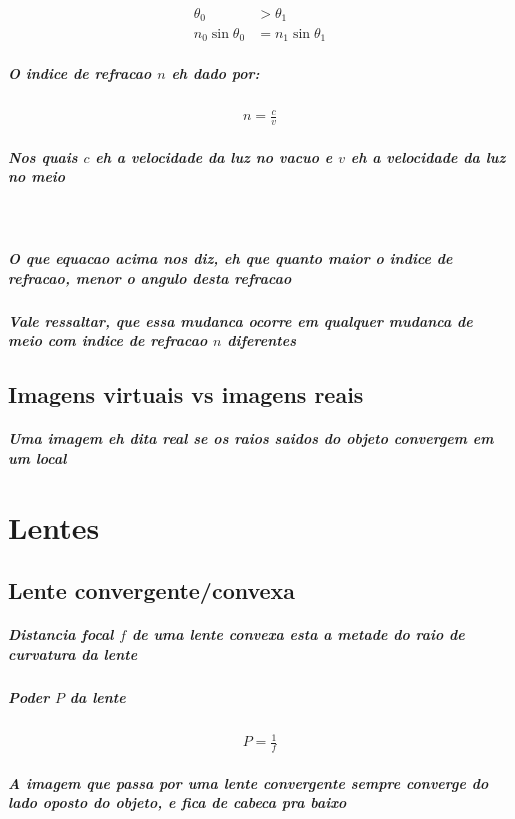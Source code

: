 \documentclass[12pt,twoside, a4paper, twocolumn]{article}
\begin{document}
\begin{equation}
    \begin{aligned}
        \theta_0          & > \theta_1          \\
        n_0\sin{\theta_0} & = n_1\sin{\theta_1}
    \end{aligned}
\end{equation}

\subparagraph*{O indice de refracao $n$ eh dado por:}

\begin{equation}
    \begin{aligned}
        n = \frac{c}{v}
    \end{aligned}
\end{equation}

\subparagraph*{Nos quais $c$ eh a velocidade da luz no vacuo e $v$ eh a velocidade da luz no meio}\

\subparagraph*{O que equacao acima nos diz, eh que quanto maior o indice de refracao, menor o angulo desta refracao}

\subparagraph*{Vale ressaltar, que essa mudanca ocorre em qualquer mudanca de meio com indice de refracao $n$ diferentes}

\subsection{Imagens virtuais vs imagens reais}
\subparagraph*{Uma imagem eh dita real se os raios saidos do objeto convergem em um local}

\section{Lentes}

\subsection{Lente convergente/convexa}

\subparagraph*{Distancia focal $f$ de uma lente convexa esta a metade do raio de curvatura da lente}

\subparagraph*{Poder $P$ da lente}

\begin{equation}
    \begin{aligned}
        P = \frac{1}{f}
    \end{aligned}
\end{equation}

\subparagraph*{A imagem que passa por uma lente convergente sempre converge do lado oposto do objeto, e fica de cabeca pra baixo}
\end{document}
